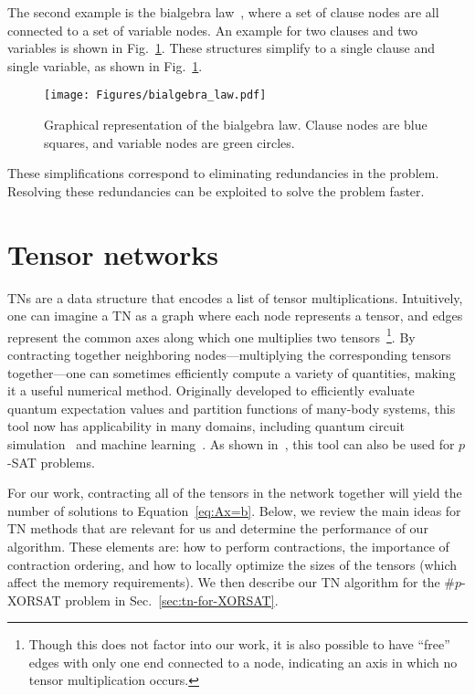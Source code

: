 The second example is the bialgebra law~\cite{denny_algebraically_2012}, where a set of clause nodes are all connected to a set of variable nodes.
An example for two clauses and two variables is shown in Fig.~\ref{fig:bialgebra_law}.
These structures simplify to a single clause and single variable, as shown in Fig.~\ref{fig:bialgebra_law}.
\begin{figure}[htbp]
    \centering
    \texttt{[image: Figures/bialgebra\_law.pdf]}
    \caption{\label{fig:bialgebra_law}Graphical representation of the bialgebra law.
    Clause nodes are blue squares, and variable nodes are green circles.}
\end{figure}

These simplifications correspond to eliminating redundancies in the problem.
Resolving these redundancies can be exploited to solve the problem faster.

\section{Tensor networks}

TNs are a data structure that encodes a list of tensor multiplications.
Intuitively, one can imagine a TN as a graph where each node represents a tensor, and edges represent the common axes along which one multiplies two tensors~\footnote{Though this does not factor into our work, it is also possible to have ``free'' edges with only one end connected to a node, indicating an axis in which no tensor multiplication occurs.}.
By contracting together neighboring nodes---multiplying the corresponding tensors together---one can sometimes efficiently compute a variety of quantities, making it a useful numerical method.
Originally developed to efficiently evaluate quantum expectation values and partition functions of many-body systems, this tool now has applicability in many domains, including quantum circuit simulation~\cite{seitz_simulating_2023} and machine learning~\cite{wang_tensor_2023}.
As shown in~\cite{garcia-saez_exact_2011}, this tool can also be used for $p$-SAT problems.

For our work, contracting all of the tensors in the network together will yield the number of solutions to Equation~\ref{eq:Ax=b}.
Below, we review the main ideas for TN methods that are relevant for us and determine the performance of our algorithm.
These elements are: how to perform contractions, the importance of contraction ordering, and how to locally optimize the sizes of the tensors (which affect the memory requirements).
We then describe our TN algorithm for the \#$p$-XORSAT problem in Sec.~\ref{sec:tn-for-XORSAT}.


